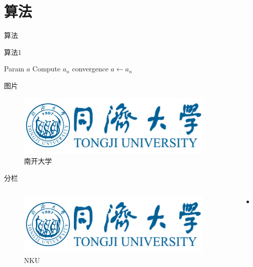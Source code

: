 \documentclass[hyperref,UTF8,11pt]{beamer}
\begin{document}

\section{算法}

\begin{frame}{算法}
    \begin{algorithm}[H]
        \caption{算法1}\label{alg:em}
        \begin{algorithmic}[1]
            \REQUIRE Param
            \ENSURE $a$
            \REPEAT
            \STATE Compute $a_n$
            \UNTIL convergence
            \RETURN $a\leftarrow a_n$
        \end{algorithmic}
    \end{algorithm}    
\end{frame}

\begin{frame}{图片}
    \begin{figure}
        \centering
        \includegraphics[width=0.85\textwidth]{tj_logo.jpg}
        \caption{南开大学}\label{fig:nk}
    \end{figure}
\end{frame}

\begin{frame}{分栏}
    \begin{columns}
        \begin{column}{0.3\textwidth}
            \begin{figure}
                \centering
                \includegraphics[width=0.95\textwidth]{tj_logo.jpg}
                \caption{NKU}\label{fig:nku}
            \end{figure}
        \end{column}
        \begin{column}{0.7\textwidth}
            \begin{itemize}
                \item ...
            \end{itemize}
        \end{column}
    \end{columns}
\end{frame}
\end{document}

